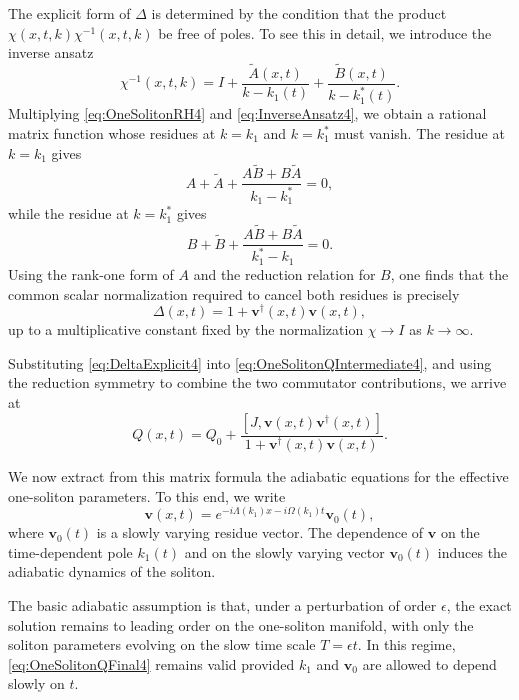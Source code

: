 \documentclass[11pt]{amsart}
\theoremstyle{definition}
\numberwithin{equation}{section}
\begin{document}
The explicit form of $\Delta$ is determined by the condition that the product $\chi(x,t,k)\chi^{-1}(x,t,k)$ be free of poles. To see this in detail, we introduce the inverse ansatz
\begin{equation}
\chi^{-1}(x,t,k)=I+\frac{\widetilde{A}(x,t)}{k-k_1(t)}+\frac{\widetilde{B}(x,t)}{k-k_1^*(t)}.
\label{eq:InverseAnsatz4}
\end{equation}
Multiplying \eqref{eq:OneSolitonRH4} and \eqref{eq:InverseAnsatz4}, we obtain a rational matrix function whose residues at $k=k_1$ and $k=k_1^*$ must vanish. The residue at $k=k_1$ gives
\[
A + \widetilde A + \frac{A\widetilde B + B\widetilde A}{k_1-k_1^*}=0,
\]
while the residue at $k=k_1^*$ gives
\[
B + \widetilde B + \frac{A\widetilde B + B\widetilde A}{k_1^*-k_1}=0.
\]
Using the rank-one form of $A$ and the reduction relation for $B$, one finds that the common scalar normalization required to cancel both residues is precisely
\begin{equation}
\Delta(x,t)=1+\mathbf{v}^\dagger(x,t)\mathbf{v}(x,t),
\label{eq:DeltaExplicit4}
\end{equation}
up to a multiplicative constant fixed by the normalization $\chi\to I$ as $k\to\infty$.

Substituting \eqref{eq:DeltaExplicit4} into \eqref{eq:OneSolitonQIntermediate4}, and using the reduction symmetry to combine the two commutator contributions, we arrive at
\begin{equation}
Q(x,t)=Q_0+\frac{[J,\mathbf{v}(x,t)\mathbf{v}^\dagger(x,t)]}{1+\mathbf{v}^\dagger(x,t)\mathbf{v}(x,t)}.
\label{eq:OneSolitonQFinal4}
\end{equation}

We now extract from this matrix formula the adiabatic equations for the effective one-soliton parameters. To this end, we write
\begin{equation}
\mathbf{v}(x,t)=e^{-i\Lambda(k_1)x-i\Omega(k_1)t}\mathbf{v}_0(t),
\label{eq:vParameterization4}
\end{equation}
where $\mathbf{v}_0(t)$ is a slowly varying residue vector. The dependence of $\mathbf{v}$ on the time-dependent pole $k_1(t)$ and on the slowly varying vector $\mathbf{v}_0(t)$ induces the adiabatic dynamics of the soliton.

The basic adiabatic assumption is that, under a perturbation of order $\epsilon$, the exact solution remains to leading order on the one-soliton manifold, with only the soliton parameters evolving on the slow time scale $T=\epsilon t$. In this regime, \eqref{eq:OneSolitonQFinal4} remains valid provided $k_1$ and $\mathbf{v}_0$ are allowed to depend slowly on $t$.
\end{document}
